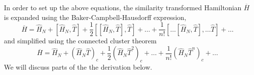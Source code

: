 \documentclass[%
oneside,                 %
final,                   %
10pt]{article}
\begin{document}
In order to set up the above equations, 
the similarity transformed Hamiltonian $\overline{H}$ is expanded
  using the Baker-Campbell-Hausdorff expression,
      \begin{equation}\label{eq:bch}
          \overline{H}= \hat{H}_N + \left[ \hat{H}_N, \hat{T} \right]
          + \frac{1}{2} \left[\left[ \hat{H}_N, \hat{T} \right],
            \hat{T}\right] + \ldots + \frac{1}{n!} \left[
            \ldots \left[ \hat{H}_N, \hat{T} \right], \ldots \hat{T}
            \right] +\dots
      \end{equation}
  and simplified using the connected cluster theorem
      \begin{equation*}
          \overline{H}= \hat{H}_N + \left( \hat{H}_N \hat{T}\right)_c
          + \frac{1}{2} \left( \hat{H}_N \hat{T}^2\right)_c + \dots +
          \frac{1}{n!} \left( \hat{H}_N \hat{T}^n\right)_c +\dots
      \end{equation*}
We will discuss parts of the the derivation below.
\end{document}
